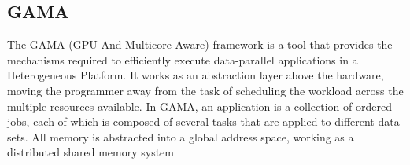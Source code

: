\subsection{GAMA}

The GAMA (GPU And Multicore Aware) framework is a tool that provides the mechanisms required to efficiently execute data-parallel applications in a Heterogeneous Platform. It works as an abstraction layer above the hardware, moving the programmer away from the task of scheduling the workload across the multiple resources available. In GAMA, an application is a collection of ordered jobs, each of which is composed of several tasks that are applied to different data sets. All memory is abstracted into a global address space, working as a distributed shared memory system \cite{ricardo2012gama}
